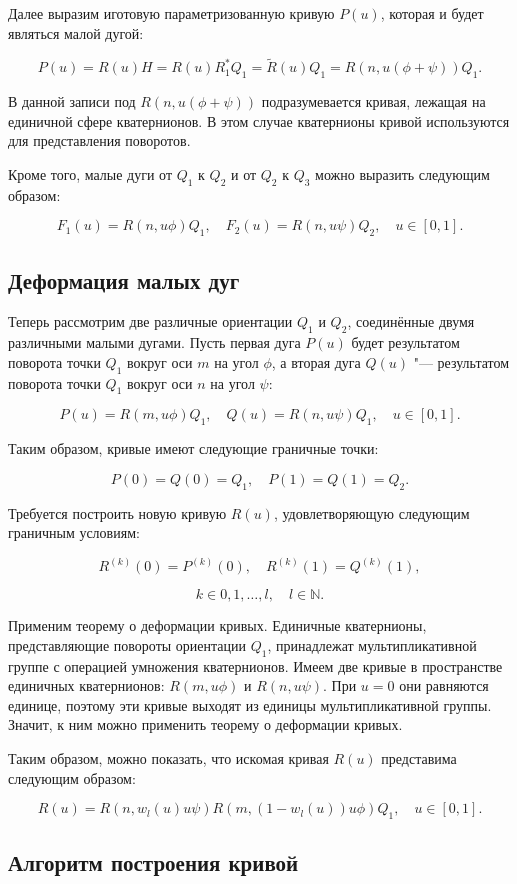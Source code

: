 Далее выразим иготовую параметризованную кривую $P(u)$, которая и будет являться малой дугой:

$$
P(u)=R(u)H=R(u)R_1^*Q_1=\tilde R(u)Q_1=R(n,u(\phi+\psi))Q_1.
$$

В данной записи под $R(n,u(\phi+\psi))$ подразумевается кривая, лежащая на единичной сфере кватернионов. В этом
случае кватернионы кривой используются для представления поворотов.

Кроме того, малые дуги от $Q_1$ к $Q_2$ и от $Q_2$ к $Q_3$ можно выразить следующим образом:

$$
F_1(u)=R(n,u\phi)Q_1, \quad F_2(u)=R(n,u\psi)Q_2, \quad u \in [0,1].
$$

\subsection*{Деформация малых дуг}

Теперь рассмотрим две различные ориентации $Q_1$ и $Q_2$, соединённые двумя различными малыми дугами. Пусть первая дуга
$P(u)$ будет результатом поворота точки $Q_1$ вокруг оси $m$ на угол $\phi$, а вторая дуга $Q(u)$ "--- результатом
поворота точки $Q_1$ вокруг оси $n$ на угол $\psi$:

$$
P(u)=R(m,u\phi)Q_1, \quad Q(u)=R(n,u\psi)Q_1, \quad u \in [0,1].
$$

Таким образом, кривые имеют следующие граничные точки:

$$
P(0)=Q(0)=Q_1, \quad P(1)=Q(1)=Q_2.
$$

Требуется построить новую кривую $R(u)$, удовлетворяющую следующим граничным условиям:

$$
R^{(k)}(0)=P^{(k)}(0), \quad R^{(k)}(1)=Q^{(k)}(1),
$$

$$
k \in {0,1,\dots,l}, \quad l \in \mathbb{N}.
$$

Применим теорему о деформации кривых. Единичные кватернионы, представляющие повороты ориентации $Q_1$, принадлежат
мультипликативной группе с операцией умножения кватернионов. Имеем две кривые в пространстве единичных кватернионов:
$R(m,u\phi)$ и $R(n,u\psi)$. При $u=0$ они равняются единице, поэтому эти кривые выходят из единицы мультипликативной
группы. Значит, к ним можно применить теорему о деформации кривых.

Таким образом, можно показать, что искомая кривая $R(u)$ представима следующим образом:

$$
R(u)=R(n,w_l(u)u\psi)R(m,(1-w_l(u))u\phi)Q_1, \quad u \in [0,1].
$$

\subsection*{Алгоритм построения кривой}

